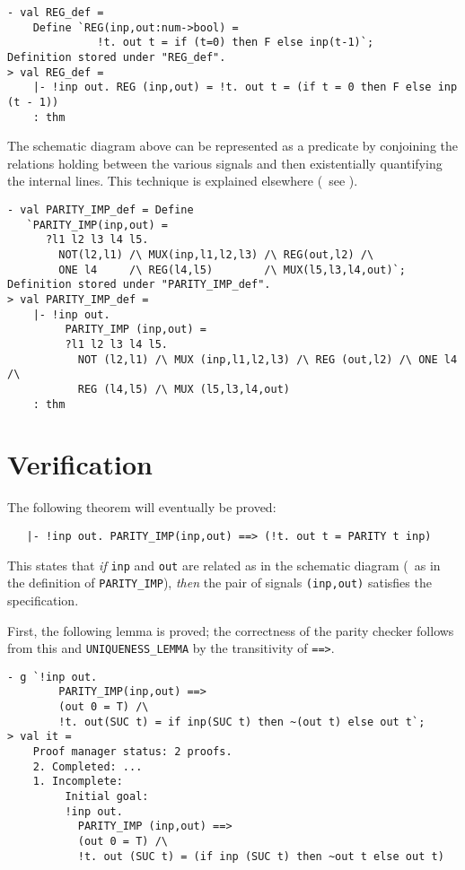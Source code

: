 \begin{session}
\begin{verbatim}
- val REG_def =
    Define `REG(inp,out:num->bool) =
              !t. out t = if (t=0) then F else inp(t-1)`;
Definition stored under "REG_def".
> val REG_def =
    |- !inp out. REG (inp,out) = !t. out t = (if t = 0 then F else inp (t - 1))
    : thm
\end{verbatim}
\end{session}

The schematic diagram above can be represented as a predicate by
conjoining the relations holding between the various
signals and then existentially quantifying the internal lines.
This technique is explained elsewhere
(\eg\ see \cite{Camilleri-et-al,Why-HOL-paper}).

\begin{session}
\begin{verbatim}
- val PARITY_IMP_def = Define
   `PARITY_IMP(inp,out) =
      ?l1 l2 l3 l4 l5.
        NOT(l2,l1) /\ MUX(inp,l1,l2,l3) /\ REG(out,l2) /\
        ONE l4     /\ REG(l4,l5)        /\ MUX(l5,l3,l4,out)`;
Definition stored under "PARITY_IMP_def".
> val PARITY_IMP_def =
    |- !inp out.
         PARITY_IMP (inp,out) =
         ?l1 l2 l3 l4 l5.
           NOT (l2,l1) /\ MUX (inp,l1,l2,l3) /\ REG (out,l2) /\ ONE l4 /\
           REG (l4,l5) /\ MUX (l5,l3,l4,out)
    : thm
\end{verbatim}
\end{session}\label{parity-imp}

\section{Verification}

The following theorem will eventually be proved:
{\small\baselineskip\HOLSpacing\begin{verbatim}
   |- !inp out. PARITY_IMP(inp,out) ==> (!t. out t = PARITY t inp)
\end{verbatim}}
This states that {\it if\/} {\small\verb|inp|} and {\small\verb|out|}
are related as in the schematic
diagram (\ie\ as in the definition of {\small\verb|PARITY_IMP|}),
{\it then\/} the
pair of signals {\small\verb|(inp,out)|} satisfies the specification.

First, the following lemma is proved; the correctness of the parity
checker follows from this and {\small\verb|UNIQUENESS_LEMMA|} by the
transitivity of {\small{\tt\verb+==>+}}.

\begin{session}
\begin{verbatim}
- g `!inp out.
        PARITY_IMP(inp,out) ==>
        (out 0 = T) /\
        !t. out(SUC t) = if inp(SUC t) then ~(out t) else out t`;
> val it =
    Proof manager status: 2 proofs.
    2. Completed: ...
    1. Incomplete:
         Initial goal:
         !inp out.
           PARITY_IMP (inp,out) ==>
           (out 0 = T) /\
           !t. out (SUC t) = (if inp (SUC t) then ~out t else out t)
\end{verbatim}
\end{session}

